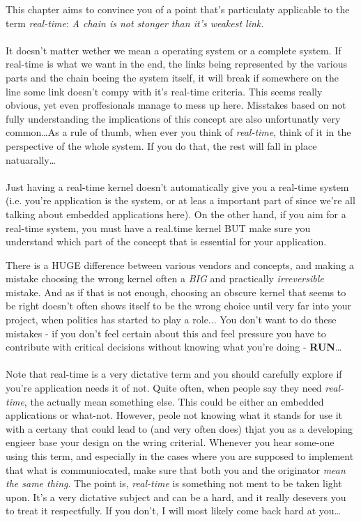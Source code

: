 This chapter aims to convince you of a point that's particulaty applicable to the term \textit{real-time}: \textit{A chain is not stonger than it's weakest link.}
\\\\
It doesn't matter wether we mean a operating system or a complete system. If real-time is what we want in the end, the links being represented by the various parts and the chain beeing the system itself, it will break if somewhere on the line some link doesn't compy with it's real-time criteria. This seems really obvious, yet even proffesionals manage to mess up here. Misstakes based on not fully understanding the implications of this concept are also unfortunatly very common\ldots As a rule of thumb, when ever you think of \textit{real-time}, think of it in the perspective of the whole system. If you do that, the rest will fall in place natuarally\ldots
\\\\
Just having a real-time kernel doesn't automatically give you a real-time system (i.e. you're application is the system, or at leas a important part of since we're all talking about embedded applications here). On the other hand, if you aim for a real-time system, you must have a real.time kernel BUT make sure you understand which part of the concept that is essential for your application. 

There is a HUGE difference between various vendors and concepts, and making a mistake choosing the wrong kernel often a \textit{BIG} and practically \textit{irreversible} mistake. And as if that is not enough, choosing an obscure kernel that seems to be right doesn't often shows itself to be the wrong choice until very far into your project, when politics has started to play a role... You don't want to do these mistakes - if you don't feel certain about this and feel pressure you have to contribute with critical decisions without knowing what you're doing - \textbf{RUN}\ldots
\\\\
Note that real-time is a very dictative term and you should carefully explore if you're application needs it of not. Quite often, when people say they need \textit{real-time}, the actually mean something else. This could be either an embedded applications or what-not. However, peole not knowing what it stands for use it with a certany that could lead to (and very often does) thjat you as a developing engieer base your design on the wring criterial. Whenever you hear some-one using this term, and especially in the cases where you are supposed to implement that what is communiocated, make sure that both you and the originator \textit{mean the same thing}. The point is, \textit{real-time} is something not ment to be taken light upon. It's a very dictative subject and can be a hard, and it really desevers you to treat it respectfully. If you don't, I will most likely come back hard at you\ldots



